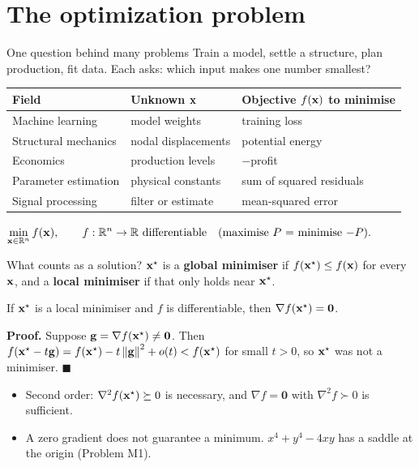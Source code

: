 \section{The optimization problem}

\begin{frame}{One question behind many problems}
  Train a model, settle a structure, plan production, fit data. Each asks: \alert{which input makes one number smallest?}

  \centering\small
  \begin{tabular}{@{}l l l@{}}
    \toprule
    Field & Unknown $\mathbf{x}$ & Objective $f(\mathbf{x})$ to minimise \\
    \midrule
    Machine learning & model weights & training loss \\
    Structural mechanics & nodal displacements & potential energy \\
    Economics & production levels & $-$profit \\
    Parameter estimation & physical constants & sum of squared residuals \\
    Signal processing & filter or estimate & mean-squared error \\
    \bottomrule
  \end{tabular}

  \raggedright
  \begin{keybox}
    \centering $\displaystyle \min_{\mathbf{x}\in\mathbb{R}^n} f(\mathbf{x}), \qquad f:\mathbb{R}^n\to\mathbb{R} \text{ differentiable}\quad\text{(maximise $P$ = minimise $-P$).}$
  \end{keybox}
\end{frame}

\begin{frame}{What counts as a solution?}
  \small
  $\mathbf{x}^\star$ is a \textbf{global minimiser} if $f(\mathbf{x}^\star)\le f(\mathbf{x})$ for every $\mathbf{x}$, and a \textbf{local minimiser}
  if that only holds near $\mathbf{x}^\star$.
  \begin{thmbox}
    If $\mathbf{x}^\star$ is a local minimiser and $f$ is differentiable, then $\nabla f(\mathbf{x}^\star) = \mathbf 0$.
  \end{thmbox}
  \textbf{Proof.} Suppose $\mathbf{g} = \nabla f(\mathbf{x}^\star)\ne\mathbf 0$. Then
  $f(\mathbf{x}^\star - t\mathbf{g}) = f(\mathbf{x}^\star) - t\left\lVert \mathbf{g} \right\rVert^2 + o(t) < f(\mathbf{x}^\star)$ for small $t>0$, so $\mathbf{x}^\star$ was not a minimiser. $\blacksquare$

  \vspace{4pt}
  \begin{itemize}\small
    \item Second order: $\nabla^2 f(\mathbf{x}^\star)\succeq 0$ is necessary, and $\nabla f = \mathbf 0$ with $\nabla^2 f\succ0$ is sufficient.
    \item A zero gradient does not guarantee a minimum. $x^4+y^4-4xy$ has a \alert{saddle} at the origin (Problem M1).
  \end{itemize}
\end{frame}

